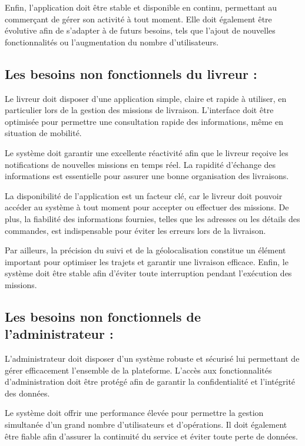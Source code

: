 \documentclass[12pt,fleqn,a4paper]{report}
\begin{document}
\begin{justify}
Enfin, l'application doit être stable et disponible en continu, permettant au commerçant de gérer son activité à tout moment. Elle doit également être évolutive afin de s'adapter à de futurs besoins, tels que l'ajout de nouvelles fonctionnalités ou l'augmentation du nombre d'utilisateurs.

\subsection{Les besoins non fonctionnels du livreur :}
Le livreur doit disposer d'une application simple, claire et rapide à utiliser, en particulier lors de la gestion des missions de livraison. L'interface doit être optimisée pour permettre une consultation rapide des informations, même en situation de mobilité.

Le système doit garantir une excellente réactivité afin que le livreur reçoive les notifications de nouvelles missions en temps réel. La rapidité d'échange des informations est essentielle pour assurer une bonne organisation des livraisons.

La disponibilité de l'application est un facteur clé, car le livreur doit pouvoir accéder au système à tout moment pour accepter ou effectuer des missions. De plus, la fiabilité des informations fournies, telles que les adresses ou les détails des commandes, est indispensable pour éviter les erreurs lors de la livraison.

Par ailleurs, la précision du suivi et de la géolocalisation constitue un élément important pour optimiser les trajets et garantir une livraison efficace. Enfin, le système doit être stable afin d'éviter toute interruption pendant l'exécution des missions.

\newpage
\subsection{Les besoins non fonctionnels de l'administrateur :}
L'administrateur doit disposer d'un système robuste et sécurisé lui permettant de gérer efficacement l'ensemble de la plateforme. L'accès aux fonctionnalités d'administration doit être protégé afin de garantir la confidentialité et l'intégrité des données.

Le système doit offrir une performance élevée pour permettre la gestion simultanée d'un grand nombre d'utilisateurs et d'opérations. Il doit également être fiable afin d'assurer la continuité du service et éviter toute perte de données.


\end{justify}
\end{document}
